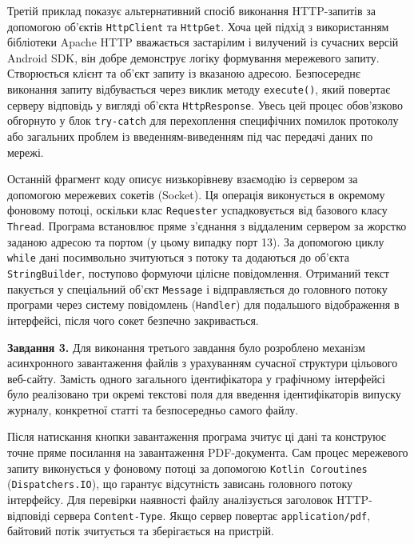 \documentclass[14pt, a4paper]{extreport}
\begin{document}
	Третій приклад показує альтернативний спосіб виконання HTTP-запитів за допомогою об'єктів \texttt{HttpClient} та \texttt{HttpGet}. Хоча цей підхід з використанням бібліотеки Apache HTTP вважається застарілим і вилучений із сучасних версій Android SDK, він добре демонструє логіку формування мережевого запиту. Створюється клієнт та об'єкт запиту із вказаною адресою. Безпосереднє виконання запиту відбувається через виклик методу \texttt{execute()}, який повертає серверу відповідь у вигляді об'єкта \texttt{HttpResponse}. Увесь цей процес обов'язково обгорнуто у блок \texttt{try-catch} для перехоплення специфічних помилок протоколу або загальних проблем із введенням-виведенням під час передачі даних по мережі.
	
	Останній фрагмент коду описує низькорівневу взаємодію із сервером за допомогою мережевих сокетів (Socket). Ця операція виконується в окремому фоновому потоці, оскільки клас \texttt{Requester} успадковується від базового класу \texttt{Thread}. Програма встановлює пряме з'єднання з віддаленим сервером за жорстко заданою адресою та портом (у цьому випадку порт 13). За допомогою циклу \texttt{while} дані посимвольно зчитуються з потоку та додаються до об'єкта \texttt{StringBuilder}, поступово формуючи цілісне повідомлення. Отриманий текст пакується у спеціальний об'єкт \texttt{Message} і відправляється до головного потоку програми через систему повідомлень (\texttt{Handler}) для подальшого відображення в інтерфейсі, після чого сокет безпечно закривається.
	
	\textbf{Завдання 3.} Для виконання третього завдання було розроблено механізм асинхронного завантаження файлів з урахуванням сучасної структури цільового веб-сайту. Замість одного загального ідентифікатора у графічному інтерфейсі було реалізовано три окремі текстові поля для введення ідентифікаторів випуску журналу, конкретної статті та безпосередньо самого файлу.
	
	
	Після натискання кнопки завантаження програма зчитує ці дані та конструює точне пряме посилання на завантаження PDF-документа. Сам процес мережевого запиту виконується у фоновому потоці за допомогою \texttt{Kotlin Coroutines} (\texttt{Dispatchers.IO}), що гарантує відсутність зависань головного потоку інтерфейсу. Для перевірки наявності файлу аналізується заголовок HTTP-відповіді сервера \texttt{Content-Type}. Якщо сервер повертає \texttt{application/pdf}, байтовий потік зчитується та зберігається на пристрій. 
	
\end{document}
